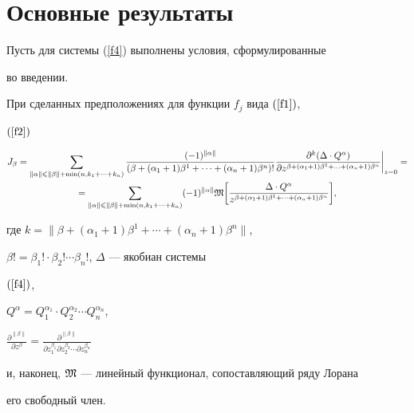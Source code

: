 \section{Основные результаты}





Пусть для системы (\ref{f4}) выполнены условия, сформулированные


во введении.








\begin{thm}\label{t1}


При сделанных предположениях для функции $f_j$ вида $(\ref{f1})$,


$(\ref{f2})$


\begin{gather*}


J_\beta=\sum_{\|\alpha\|\leqslant\|\beta\|+\min(n,k_1+\dotsb+k_n)}


\frac{(-1)^{\|\alpha\|}}{(\beta+(\alpha_1+1)\beta^1+\dotsb


+(\alpha_n+1)\beta^n)!}\frac{\partial^k(\Delta\cdot Q^\alpha)}


{\partial z^{\beta+(\alpha_1+1)\beta^1+\dotsc+(\alpha_n+1)\beta^n}}


\bigg|_{z=0}= \\


%


=\sum_{\|\alpha\|\leqslant\|\beta\|+\min(n,k_1+\dotsb+k_n)}(-1)^{\|\alpha\|}


\frak{M}\bigg[\frac{\Delta\cdot Q^\alpha}{z^{\beta+(\alpha_1+1)\beta^1+


\dotsb+(\alpha_n+1)\beta^n}}\bigg],


\end{gather*}


где $k=\|\beta+(\alpha_1+1)\beta^1+\dotsb+(\alpha_n+1)\beta^n\|$,


$\beta!=\beta_1!\cdot\beta_2!\dotsb\beta_n!$, $\Delta$ --- якобиан системы


$(\ref{f4})$,


$Q^\alpha=Q_1^{\alpha_1}\cdot Q_2^{\alpha_2}\dotsb Q_n^{\alpha_n}$,


$\frac{\partial^{\|\beta\|}}{\partial z^\beta}=\frac{\partial^{\|\beta\|}}


{\partial z_1^{\beta_1}\partial z_2^{\beta_2}\dotsb\partial z_n^{\beta_n}}$


и, наконец, $\frak M$ --- линейный функционал, сопоставляющий ряду Лорана


его свободный член.


\end{thm}








